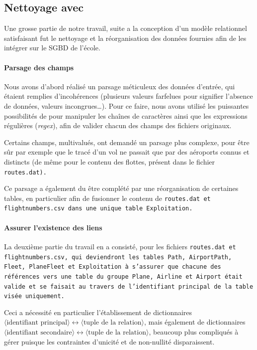 \documentclass[a4paper, 11pt, twoside]{book}
\let\paragraphoriginal\paragraph
\renewcommand{\paragraph}[1]{\paragraphoriginal{#1}\mbox{}}
\begin{document}
\subsection{Nettoyage avec }

Une grosse partie de notre travail, suite a la conception d'un modèle relationnel satisfaisant fut le nettoyage et la réorganisation des données fournies afin de les intégrer sur le SGBD de l'école.

\paragraph{Parsage des champs}

Nous avons d'abord réalisé un parsage méticuleux des données d'entrée, qui étaient remplies d'incohérences (plusieurs valeurs farfelues pour signifier l'absence de données, valeurs incongrues\ldots{}). Pour ce faire, nous avons utilisé les puissantes possibilités de  pour manipuler les chaînes de caractères ainsi que les expressions régulières (\emph{regex}), afin de valider chacun des champs des fichiers originaux.

Certains champs, multivalués, ont demandé un parsage plus complexe, pour être sûr par exemple que le tracé d'un vol ne passait que par des aéroports connus et distincts (de même pour le contenu des flottes, présent dans le fichier \tt{routes.dat}).

Ce parsage a également du être complété par une réorganisation de certaines tables, en particulier afin de fusionner le contenu de \tt{routes.dat} et \tt{flightnumbers.csv} dans une unique table \tt{Exploitation}.

\paragraph{Assurer l'existence des liens}

La deuxième partie du travail en  a consisté, pour les fichiers \tt{routes.dat} et \tt{flightnumbers.csv}, qui deviendront les tables \tt{Path}, \tt{AirportPath}, \tt{Fleet}, \tt{PlaneFleet} et \tt{Exploitation} à s'assurer que chacune des références vers une table du groupe \tt{Plane}, \tt{Airline} et \tt{Airport} était valide et se faisait au travers de l'identifiant principal de la table visée uniquement.

Ceci a nécessité en particulier l'établissement de dictionnaires $\langle\text{identifiant principal}\rangle \leftrightarrow \langle\text{tuple de la relation}\rangle$, mais également de dictionnaires $\langle\text{identifiant secondaire}\rangle \leftrightarrow \langle\text{tuple de la relation}\rangle$, beaucoup plus compliqués à gérer puisque les contraintes d'unicité et de non-nullité disparaissent.
\end{document}
